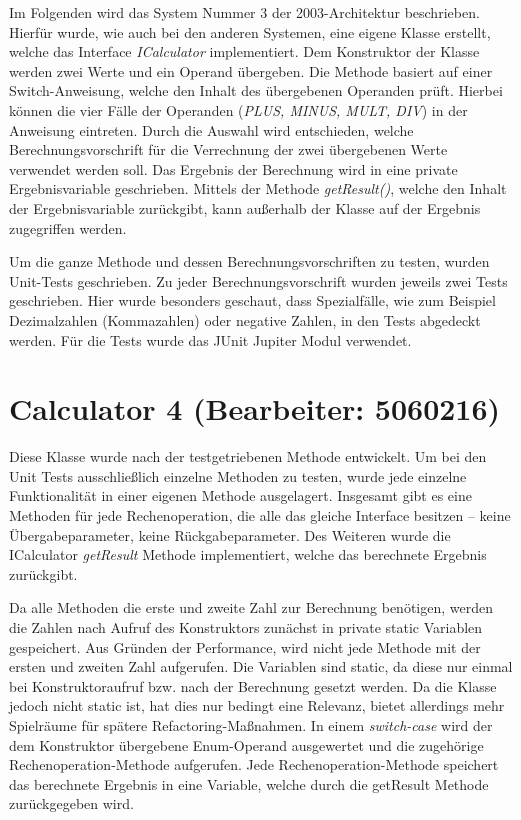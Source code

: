 Im Folgenden wird das System Nummer 3 der 2003-Architektur beschrieben. Hierfür wurde, wie auch bei den anderen Systemen, eine eigene Klasse erstellt, welche das Interface \textit{ICalculator} implementiert. Dem Konstruktor der Klasse werden zwei Werte und ein Operand übergeben. Die Methode basiert auf einer Switch-Anweisung, welche den Inhalt des übergebenen Operanden prüft. Hierbei können die vier Fälle der Operanden (\textit{PLUS, MINUS, MULT, DIV}) in der Anweisung eintreten. Durch die Auswahl wird entschieden, welche Berechnungsvorschrift für die Verrechnung der zwei übergebenen Werte verwendet werden soll.  Das Ergebnis der Berechnung wird in eine private Ergebnisvariable geschrieben. Mittels der Methode \textit{getResult()}, welche den Inhalt der Ergebnisvariable zurückgibt, kann außerhalb der Klasse auf der Ergebnis zugegriffen werden. 


Um die ganze Methode und dessen Berechnungsvorschriften zu testen, wurden Unit-Tests geschrieben. Zu jeder Berechnungsvorschrift wurden jeweils zwei Tests geschrieben. Hier wurde besonders geschaut, dass Spezialfälle, wie zum Beispiel Dezimalzahlen (Kommazahlen) oder negative Zahlen, in den Tests abgedeckt werden. Für die Tests wurde das JUnit Jupiter Modul verwendet.


\chapter{Calculator 4 (Bearbeiter: 5060216)}

Diese Klasse wurde nach der testgetriebenen Methode entwickelt. Um bei den Unit Tests ausschließlich einzelne Methoden zu testen, wurde jede einzelne Funktionalität in einer eigenen Methode ausgelagert. Insgesamt gibt es eine Methoden für jede Rechenoperation, die alle das gleiche Interface besitzen – keine Übergabeparameter, keine Rückgabeparameter. Des Weiteren wurde die ICalculator \textit{getResult} Methode implementiert, welche das berechnete Ergebnis zurückgibt.

Da alle Methoden die erste und zweite Zahl zur Berechnung benötigen, werden die Zahlen nach Aufruf des Konstruktors zunächst in private static Variablen gespeichert. Aus Gründen der Performance, wird nicht jede Methode mit der ersten und zweiten Zahl aufgerufen. Die Variablen sind static, da diese nur einmal bei Konstruktoraufruf bzw. nach der Berechnung gesetzt werden. Da die Klasse jedoch nicht static ist, hat dies nur bedingt eine Relevanz, bietet allerdings mehr Spielräume für spätere Refactoring-Maßnahmen.
In einem \textit{switch-case} wird der dem Konstruktor übergebene Enum-Operand ausgewertet und die zugehörige Rechenoperation-Methode aufgerufen. Jede Rechenoperation-Methode speichert das berechnete Ergebnis in eine Variable, welche durch die getResult Methode zurückgegeben wird.

